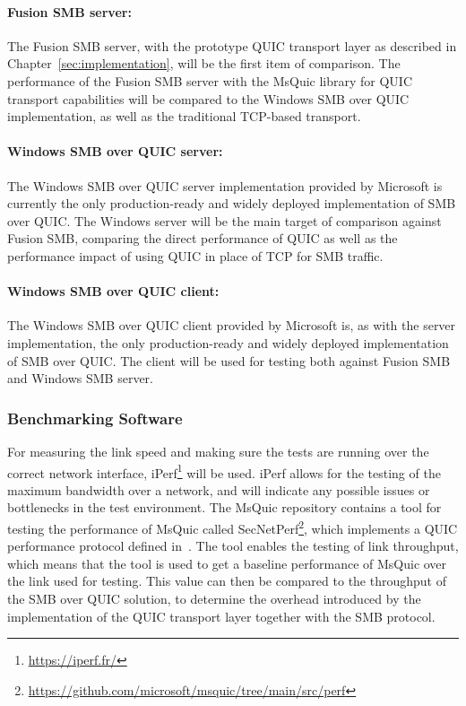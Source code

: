\documentclass[english, 12pt, a4paper, elec, utf8, a-2b, online]{aaltothesis}
\begin{document}
\paragraph{Fusion SMB server:}

The Fusion SMB server, with the prototype QUIC transport layer as described in
Chapter~\ref{sec:implementation}, will be the first item of comparison. The performance
of the Fusion SMB server with the MsQuic library for QUIC transport capabilities will
be compared to the Windows SMB over QUIC implementation, as well as the traditional
TCP-based transport.

\paragraph{Windows SMB over QUIC server:}

The Windows SMB over QUIC server implementation provided by Microsoft is currently
the only production-ready and widely deployed implementation of SMB over QUIC. The
Windows server will be the main target of comparison
against Fusion SMB, comparing the direct performance of QUIC as well as the performance
impact of using QUIC in place of TCP for SMB traffic.

\paragraph{Windows SMB over QUIC client:}

The Windows SMB over QUIC client provided by Microsoft is, as with the server implementation,
the only production-ready and widely deployed implementation of SMB over QUIC. The client
will be used for testing both against Fusion SMB and Windows SMB server.

\subsubsection{Benchmarking Software}

For measuring the link speed and making sure the tests are running over the correct
network interface, iPerf\footnote{\url{https://iperf.fr/}} will be used. iPerf allows
for the testing of the maximum bandwidth over a network, and will indicate any
possible issues or bottlenecks in the test environment.
The MsQuic repository contains a tool for testing the performance of MsQuic called
SecNetPerf\footnote{\url{https://github.com/microsoft/msquic/tree/main/src/perf}},
which implements a QUIC performance protocol defined in~\cite{banks-quic-performance-00}.
The tool enables the testing of link throughput, which means that the tool is used
to get a baseline performance of MsQuic over the link used for testing. This value can then
be compared to the throughput of the SMB over QUIC solution, to determine the overhead
introduced by the implementation of the QUIC transport layer together with the SMB protocol.
\end{document}
